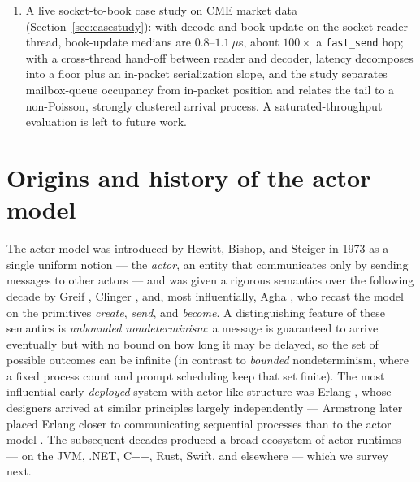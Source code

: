 \documentclass[11pt]{article}
\newcommand{\fs}{\texttt{fast\_send}}
\begin{document}
\begin{enumerate}[leftmargin=1.6em]
  per-message work eliminated and microbenchmarks of the C++ implementation,
  including drain-side batching ($1.63\times$) and memory pooling that together
  raise asynchronous throughput $2.46\times$, and the pool's
  two-order-of-magnitude reduction of the latency-tail maximum
  (Section~\ref{sec:perf}).
  \item A live socket-to-book case study on CME market data
  (Section~\ref{sec:casestudy}): with decode and book update on the
  socket-reader thread, book-update medians are $0.8$--$1.1~\mu$s, about
  $100\times$ a \fs{} hop; with a cross-thread hand-off between reader and
  decoder, latency decomposes into a floor plus an in-packet serialization slope,
  and the study separates mailbox-queue occupancy from in-packet position and relates the tail to a non-Poisson, strongly
  clustered arrival process. A saturated-throughput evaluation is left to
  future work.
\end{enumerate}

\section{Origins and history of the actor model}
\label{sec:history}

The actor model was introduced by Hewitt, Bishop, and Steiger in 1973
\cite{hewitt1973} as a single uniform notion --- the \emph{actor}, an entity that
communicates only by sending messages to other actors --- and was given a rigorous
semantics over the following decade by Greif \cite{greif1975}, Clinger
\cite{clinger1981}, and, most influentially, Agha \cite{agha1986}, who recast the
model on the primitives \emph{create}, \emph{send}, and \emph{become}. A
distinguishing feature of these semantics is \emph{unbounded nondeterminism}: a
message is guaranteed to arrive eventually but with no bound on how long it may be
delayed, so the set of possible outcomes can be infinite (in contrast to
\emph{bounded} nondeterminism, where a fixed process count and prompt scheduling
keep that set finite). The most influential early \emph{deployed} system with
actor-like structure was Erlang \cite{armstrong1996}, whose designers arrived at
similar principles largely independently --- Armstrong later placed Erlang closer
to communicating sequential processes than to the actor model \cite{armstrong2007}.
The subsequent decades produced a broad ecosystem of actor runtimes --- on the
JVM, .NET, C++, Rust, Swift, and elsewhere --- which we survey next.
\end{document}
